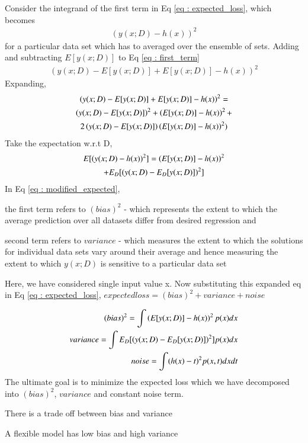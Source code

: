 \documentclass[journal,12pt,twocolumn]{IEEEtran}
\begin{document}
Consider the integrand of the first term in Eq \eqref{eq : expected_loss}, which becomes
\begin{align}
    (y(x;D) - h(x))^2 \label{eq : first_term}
\end{align}
for a particular data set which has to averaged over the ensemble of sets.
Adding and subtracting $E[y(x;D)]$ to Eq \eqref{eq : first_term}
\begin{align}
    (y(x;D) - E[y(x;D)] + E[y(x;D)]- h(x))^2
\end{align}
Expanding,
\begin{multline}
    \left(y(x;D) - E[y(x;D)] + E[y(x;D)]- h(x)\right)^2 = \\
      \left(y(x;D) - E[y(x;D)]\right)^2 + \left(E[y(x;D)]- h(x)\right)^2 + \\
      2\left(y(x;D) - E[y(x;D)]\right)\left(E[y(x;D)]- h(x)\right)^2)
\end{multline}
Take the expectation w.r.t D,
\begin{multline}
    E[(y(x;D) - h(x))^2] = \left(E[y(x;D)]- h(x)\right)^2\\
       + E_{D}[(y(x;D) - E_{D}[y(x;D)])^2] \label{eq : modified_expected}
\end{multline}
In Eq \eqref{eq : modified_expected}, 

the first term refers to $(bias)^2$ - which represents the extent to which the average prediction over all datasets differ from desired regression and

second term refers to $variance$ - which measures the extent to which the solutions for individual data sets vary around their average and hence measuring the extent to which $y(x;D)$
is sensitive to a particular data set

Here, we have considered single input value x. Now substituting this expanded eq in Eq \eqref{eq : expected_loss},
$expected loss = (bias)^2 + variance + noise$

\begin{align}
    (bias)^2 = \int \left(E[y(x;D)]- h(x)\right)^2 p(x) dx\\
    variance = \int E_{D}[(y(x;D) - E_{D}[y(x;D)])^2] p(x) dx\\
    noise = \int(h(x) - t)^2p(x,t)dx dt
\end{align}
The ultimate goal is to minimize the expected loss which we have decomposed into $(bias)^2$, $variance$ and constant noise term.

There is a trade off between bias and variance

A flexible model has low bias and high variance
\end{document}
